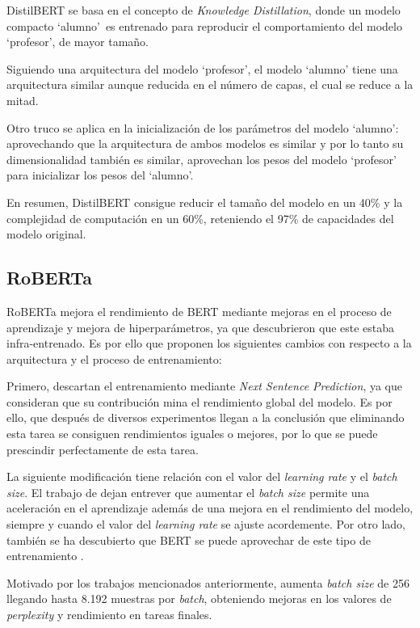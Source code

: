 DistilBERT \citep{Sanh2019} se basa en el concepto de \emph{Knowledge Distillation}, donde un modelo compacto `alumno'\ es entrenado para reproducir el comportamiento del modelo `profesor', de mayor tamaño.

Siguiendo una arquitectura del modelo `profesor', el modelo `alumno' tiene una arquitectura similar aunque reducida en el número de capas, el cual se reduce a la mitad. 

Otro truco se aplica en la inicialización de los parámetros del modelo `alumno': aprovechando que la arquitectura de ambos modelos es similar y por lo tanto su dimensionalidad también es similar, aprovechan los pesos del modelo `profesor' para inicializar los pesos del `alumno'.

En resumen, DistilBERT consigue reducir el tamaño del modelo en un 40\% y la complejidad de computación en un 60\%, reteniendo el 97\% de capacidades del modelo original.

\subsection{RoBERTa}

RoBERTa \citep{Liu2019} mejora el rendimiento de BERT mediante mejoras en el proceso de aprendizaje y mejora de hiperparámetros, ya que descubrieron que este estaba infra-entrenado. Es por ello que proponen los siguientes cambios con respecto a la arquitectura y el proceso de entrenamiento:

Primero, descartan el entrenamiento mediante \emph{Next Sentence Prediction}, ya que consideran que su contribución mina el rendimiento global del modelo. Es por ello, que después de diversos experimentos llegan a la conclusión que eliminando esta tarea se consiguen rendimientos iguales o mejores, por lo que se puede prescindir perfectamente de esta tarea.

La siguiente modificación tiene relación con el valor del \emph{learning rate} y el \emph{batch size}. El trabajo de \citet{Ott2018} dejan entrever que aumentar el \emph{batch size} permite una aceleración en el aprendizaje además de una mejora en el rendimiento del modelo, siempre y cuando el valor del \emph{learning rate} se ajuste acordemente. Por otro lado, también se ha descubierto que BERT se puede aprovechar de este tipo de entrenamiento \citep{You2019}. 

Motivado por los trabajos mencionados anteriormente, \citet{Liu2019} aumenta \emph{batch size} de 256 llegando hasta 8.192 muestras por \emph{batch}, obteniendo mejoras en los valores de \emph{perplexity} y rendimiento en tareas finales.

